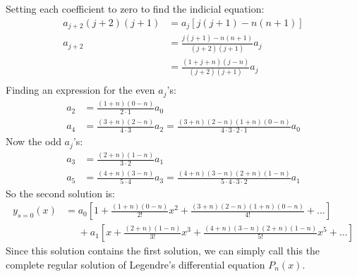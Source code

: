 \documentclass{article}
\begin{document}
Setting each coefficient to zero to find the indicial equation:
\begin{equation*}
\begin{aligned}
	a_{j+2}(j+2)(j+1) &= a_j[j(j+1)-n(n+1)] \\
	a_{j+2} &= \frac{j(j+1)-n(n+1)}{(j+2)(j+1)}a_j \\
	&= \frac{(1+j+n)(j-n)}{(j+2)(j+1)}a_j \\
\end{aligned}
\end{equation*}
Finding an expression for the even $a_j$'s:
\begin{equation*}
\begin{aligned}
	a_2 &= \frac{(1+n)(0-n)}{2\cdot 1}a_0 \\
	a_4 &= \frac{(3+n)(2-n)}{4\cdot 3}a_2 = \frac{(3+n)(2-n)(1+n)(0-n)}{4\cdot 3\cdot 2\cdot 1}a_0
\end{aligned}
\end{equation*}
Now the odd $a_j$'s:
\begin{equation*}
\begin{aligned}
	a_3 &= \frac{(2+n)(1-n)}{3\cdot 2}a_1 \\
	a_5 &= \frac{(4+n)(3-n)}{5\cdot 4}a_3 = \frac{(4+n)(3-n)(2+n)(1-n)}{5\cdot 4\cdot 3\cdot 2}a_1
\end{aligned}
\end{equation*}
So the second solution is:
\begin{equation*}
\begin{aligned}
	y_{s=0}(x) &= a_0\left[1 + \frac{(1+n)(0-n)}{2!}x^2 + \frac{(3+n)(2-n)(1+n)(0-n)}{4!}+\dots\right] \\
	&\phantom{=} + a_1\left[x+ \frac{(2+n)(1-n)}{3!}x^3 + \frac{(4+n)(3-n)(2+n)(1-n)}{5!}x^5 + \dots\right]
\end{aligned}
\end{equation*}
Since this solution contains the first solution, we can simply call this the complete regular solution of Legendre's differential equation $P_n(x)$.
\end{document}
